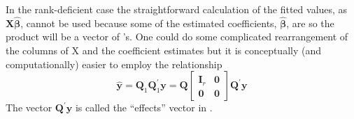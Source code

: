 \documentclass[shortnames,article]{jss}
\begin{document}
In the rank-deficient case the straightforward calculation of the
fitted values, as $\bm X\widehat{\bm\beta}$, cannot be used because
some of the estimated coefficients, $\widehat{\bm\beta}$, are 
so the product will be a vector of 's.  One could do some
complicated rearrangement of the columns of X and the coefficient
estimates but it is conceptually (and computationally) easier to
employ the relationship
\begin{displaymath}
  \widehat{\bm y} = \bm Q_1\bm Q_1^\prime\bm y=\bm Q
  \begin{bmatrix}
    \bm I_r & \bm 0\\
    \bm 0   & \bm 0
  \end{bmatrix}
  \bm Q^\prime\bm y
\end{displaymath}
The vector $\bm Q^\prime\bm y$ is called the ``effects'' vector in .
\end{document}
